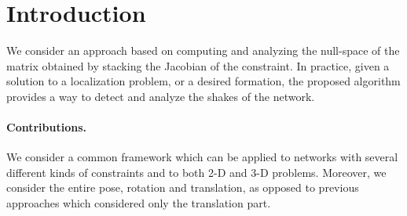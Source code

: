 \documentclass[12pt]{article}
\begin{document}

\section{Introduction}


We consider an approach based on computing and analyzing the null-space of the matrix obtained by stacking the Jacobian of the constraint. In practice, given a solution to a localization problem, or a desired formation, the proposed algorithm provides a way to detect and analyze the shakes of the network.
\paragraph{Contributions.} We consider a common framework which can be applied to networks with several different kinds of constraints and to both 2-D and 3-D problems. Moreover, we consider the entire pose, rotation and translation, as opposed to previous approaches which considered only the translation part. 
\end{document}

